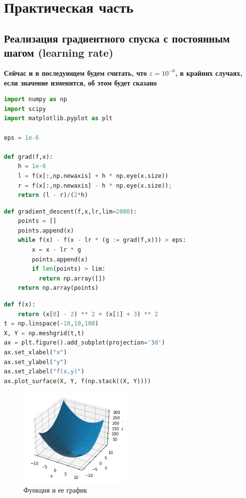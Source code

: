 \chapter{Практическая часть}
\label{ch:chap2}

\section{Реализация градиентного спуска с постоянным шагом (learning rate)}
\label{sec:fig}

\textbf{Сейчас и в последующем будем считать, что $\varepsilon = 10^{-6}$, в крайних случаях, если значение изменится, об этом будет сказано}

\begin{lstlisting}[language=Python, caption=Функция градиента]
import numpy as np
import scipy
import matplotlib.pyplot as plt

eps = 1e-6

def grad(f,x):
    h = 1e-6
    l = f(x[:,np.newaxis] + h * np.eye(x.size))
    r = f(x[:,np.newaxis] - h * np.eye(x.size));
    return (l - r)/(2*h)
\end{lstlisting}

\begin{lstlisting}[language=Python, caption=Градиентный спуск]
def gradient_descent(f,x,lr,lim=2000):
    points = []
    points.append(x)
    while f(x) - f(x - lr * (g := grad(f,x))) > eps:
        x = x - lr * g
        points.append(x)
        if len(points) > lim:
          return np.array([])
    return np.array(points)
\end{lstlisting}

\begin{lstlisting}[language=Python]
def f(x):
    return (x[0] - 2) ** 2 + (x[1] + 3) ** 2
t = np.linspace(-10,10,100)
X, Y = np.meshgrid(t,t)
ax = plt.figure().add_subplot(projection='3d')
ax.set_xlabel("x")
ax.set_ylabel("y")
ax.set_zlabel("f(x,y)")
ax.plot_surface(X, Y, f(np.stack((X, Y))))
\end{lstlisting}

\newpage

\begin{figure}[ht]
    \centering
    \includegraphics[width=0.5\textwidth]{images/gd1.png}
    \caption{Функция и ее график}
    \label{fig:gd1}
\end{figure}

